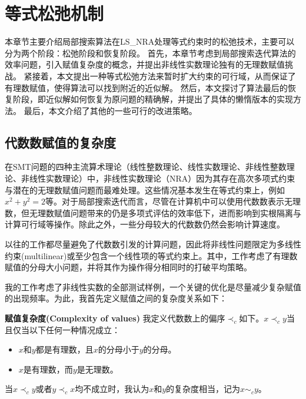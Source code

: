 \chapter{等式松弛机制}\label{chap:method2}

本章节主要介绍局部搜索算法在LS\_NRA处理等式约束时的松弛技术，主要可以分为两个阶段：松弛阶段和恢复阶段。
首先，本章节考虑到局部搜索迭代算法的效率问题，引入赋值复杂度的概念，并提出非线性实数理论独有的无理数赋值挑战。
紧接着，本文提出一种等式松弛方法来暂时扩大约束的可行域，从而保证了有理数赋值，使得算法可以找到附近的近似解。
然后，本文探讨了算法最后的恢复阶段，即近似解如何恢复为原问题的精确解，并提出了具体的懒惰版本的实现方法。
最后，本文介绍了其他的一些可行的改进策略。

\section{代数数赋值的复杂度}
在SMT问题的四种主流算术理论（线性整数理论、线性实数理论、非线性整数理论、非线性实数理论）中，非线性实数理论（NRA）因为其存在高次多项式约束与潜在的无理数赋值问题而最难处理。这些情况基本发生在等式约束上，例如$x^2 + y^2 = 2$等。对于局部搜索迭代而言，尽管在计算机中可以使用代数数表示无理数，但无理数赋值问题带来的仍是多项式评估的效率低下，进而影响到实根隔离与计算可行域等操作。除此之外，一些分母较大的代数数仍然会影响计算速度。

以往的工作\cite{multilinear,LiXZ23}都尽量避免了代数数引发的计算问题，因此将非线性问题限定为多线性约束(multilinear)或至少包含一个线性项的等式约束上。其中，工作\cite{multilinear}考虑了有理数赋值的分母大小问题，并将其作为操作得分相同时的打破平均策略。

我的工作考虑了非线性实数的全部测试样例，一个关键的优化是尽量减少复杂赋值的出现频率。为此，我首先定义赋值之间的复杂度关系如下：

\begin{definition}{\textbf{赋值复杂度(Complexity of values)}}
\label{def:complexity}
我定义代数数上的偏序$\prec_c$如下。$x \prec_c y$当且仅当以下任何一种情况成立：

\begin{itemize}
    \item $x$和$y$都是有理数，且$x$的分母小于$y$的分母。
    \item $x$是有理数，而$y$是无理数。
\end{itemize}
当$x \prec_c y$或者$y \prec_c x$均不成立时，我认为$x$和$y$的复杂度相当，记为$x \sim_c y$。
\end{definition}

